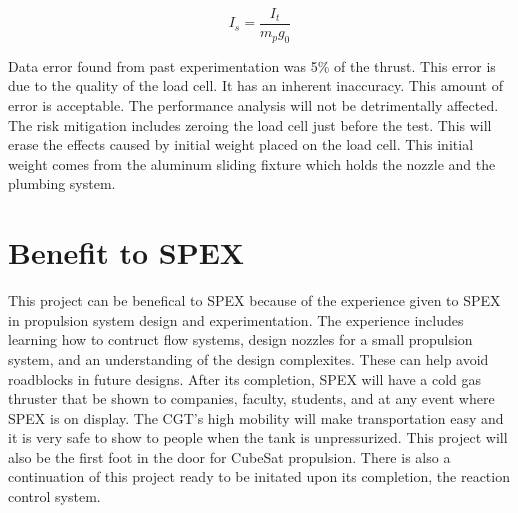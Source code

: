 \documentclass[conference]{IEEEtran} %
\begin{document}
\begin{equation} \label{specific-impulse}
  I_s = \frac{I_t}{m_p g_0}
\end{equation}

Data error found from past experimentation was 5\% of the thrust. This error is due to the quality of the load cell. It has an inherent inaccuracy. This
amount of error is acceptable. The performance analysis will not be detrimentally affected. The risk mitigation includes zeroing the load cell just before the test.
This will erase the effects caused by initial weight placed on the load cell. This initial weight comes from the aluminum sliding fixture which holds the nozzle
and the plumbing system.




\section{Benefit to SPEX}
\label{sec:benefit}

This project can be benefical to SPEX because of the experience given to SPEX in propulsion system design and experimentation. The experience includes learning how to contruct flow systems, design nozzles
for a small propulsion system, and an understanding of the design complexites. These can help avoid roadblocks in future designs. After its completion, SPEX will have a cold gas thruster that
be shown to companies, faculty, students, and at any event where SPEX is on display. The CGT's high mobility will make transportation easy and it is very safe to show to people when the tank is unpressurized. This project
will also be the first foot in the door for CubeSat propulsion. There is also a continuation of this project ready to be initated upon its completion, the
reaction control system.
\end{document}
